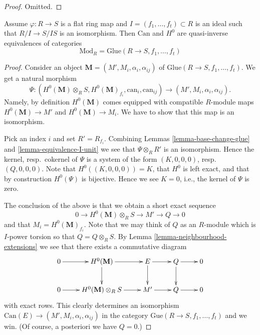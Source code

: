 \begin{proof}
Omitted.
\end{proof}

\begin{proposition}
\label{proposition-equivalence}
Assume $\varphi : R \to S$ is a flat ring map and
$I = (f_1, \ldots, f_t) \subset R$ is an ideal such that
$R/I \to S/IS$ is an isomorphism. Then $\text{Can}$ and
$H^0$ are quasi-inverse equivalences of categories
$$
\text{Mod}_R = \text{Glue}(R \to S, f_1, \ldots, f_t)
$$
\end{proposition}

\begin{proof}
Consider an object $\mathbf{M} = (M', M_i, \alpha_i, \alpha_{ij})$
of $\text{Glue}(R \to S, f_1, \ldots, f_t)$.
We get a natural morphism
$$
\Psi :
(H^0(\mathbf{M}) \otimes_R S, H^0(\mathbf{M})_{f_i},
\text{can}_i, \text{can}_{ij})
\longrightarrow
(M', M_i, \alpha_i, \alpha_{ij}).
$$
Namely, by definition $H^0(\mathbf{M})$ comes equipped with compatible
$R$-module maps $H^0(\mathbf{M}) \to M'$ and $H^0(\mathbf{M}) \to M_i$.
We have to show that this map is an isomorphism.

\medskip\noindent
Pick an index $i$ and set $R' = R_{f_i}$. Combining
Lemmas \ref{lemma-base-change-glue} and \ref{lemma-equivalence-I-unit}
we see that $\Psi \otimes_R R'$ is an isomorphism.
Hence the kernel, resp.\ cokernel of $\Psi$ is a system of the form
$(K, 0, 0, 0)$, resp.\ $(Q, 0, 0, 0)$. Note that
$H^0((K, 0, 0, 0)) = K$, that $H^0$ is left exact, and that by
construction $H^0(\Psi)$ is bijective. Hence we see $K = 0$, i.e.,
the kernel of $\Psi$ is zero.

\medskip\noindent
The conclusion of the above is that we obtain a short exact sequence
$$
0 \to H^0(\mathbf{M}) \otimes_R S \to M' \to Q \to 0
$$
and that $M_i = H^0(\mathbf{M})_{f_i}$.
Note that we may think of $Q$ as an $R$-module which is $I$-power
torsion so that $Q = Q \otimes_R S$. By
Lemma \ref{lemma-neighbourhood-extensions}
we see that there exists a commutative diagram
$$
\xymatrix{
0 \ar[r] &
H^0(\mathbf{M}) \ar[r] \ar[d] &
E \ar[r] \ar[d] &
Q \ar[r] \ar[d] &
0 \\
0 \ar[r] &
H^0(\mathbf{M}) \otimes_R S \ar[r] &
M' \ar[r] &
Q \ar[r] &
0
}
$$
with exact rows. This clearly determines an isomorphism
$\text{Can}(E) \to (M', M_i, \alpha_i, \alpha_{ij})$
in the category $\text{Gue}(R \to S, f_1, \ldots, f_t)$
and we win. (Of course, a posteriori we have $Q = 0$.)
\end{proof}


